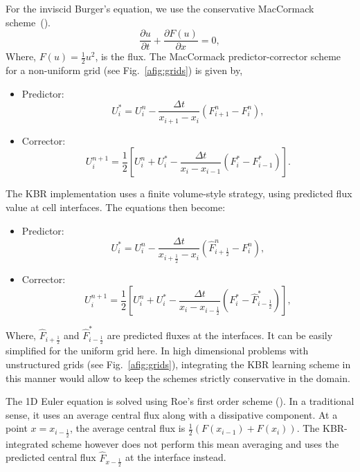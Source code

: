 \documentclass{article} %
\theoremstyle{plain}
\begin{document}
For the inviscid Burger's equation, we use the conservative MacCormack scheme~(\cite{laney1998computational}). 
\[
\frac{\partial u}{\partial t} + \frac{\partial F(u)}{\partial x}=0,
\]
Where, $F(u) = \frac{1}{2}u^2$, is the flux. The MacCormack predictor-corrector scheme for a non-uniform grid (see Fig.~\ref{afig:grids}) is given by,
\begin{itemize}
    \item Predictor:
    \begin{equation}
U_i^{*} = U_i^n - \frac{\Delta t}{x_{i+1}-x_i}\left(F_{i+1}^n - F_i^n\right),
\end{equation}
    \item Corrector:
\begin{equation}
U_i^{n+1} = \frac{1}{2} \left[U_i^n + U_i^{*} - \frac{\Delta t}{x_i - x_{i-1}}
\left(
F_i^{*}-F_{i-1}^{*}
\right)
\right].
\end{equation}
\end{itemize}

The KBR implementation uses a finite volume-style strategy, using predicted flux value at cell interfaces. The equations then become:
\begin{itemize}
    \item Predictor:
    \begin{equation}
U_i^{*}=U_i^n-\frac{\Delta t}{x_{i+\frac{1}{2}}-x_i}\left(\hat{F}_{i+\frac{1}{2}}^n - F_i^n\right),
\end{equation}
    \item Corrector:
\begin{equation}
U_i^{n+1}= \frac{1}{2}\left[ U_i^n+U_i^{*}-\frac{\Delta t}{x_{i}-x_{i-\frac{1}{2}}}\left(F_i^{*}-\hat{F}_{i-\frac{1}{2}}^{*}\right)\right],
\end{equation}
\end{itemize}
Where, $\hat{F}_{i+\frac{1}{2}}$ and $\hat{F}_{i-\frac{1}{2}}^{*}$ are predicted fluxes at the interfaces. It can be easily simplified for the uniform grid here. In high dimensional problems with unstructured grids (see Fig.~\ref{afig:grids}), integrating the KBR learning scheme in this manner would allow to keep the schemes strictly conservative in the domain.  

The 1D Euler equation is solved using Roe's first order scheme (\cite{laney1998computational}). In a traditional sense, it uses an average central flux along with a dissipative component. 
At a point $x = x_{i-\frac{1}{2}}$, the average central flux is 
$\frac{1}{2}\left( F(x_{i-1}) + F(x_{i}) \right)$. 
The KBR-integrated scheme however does not perform this mean averaging and 
uses the predicted central flux $\hat{F}_{x-\frac{1}{2}}$ at the interface instead.
\end{document}
